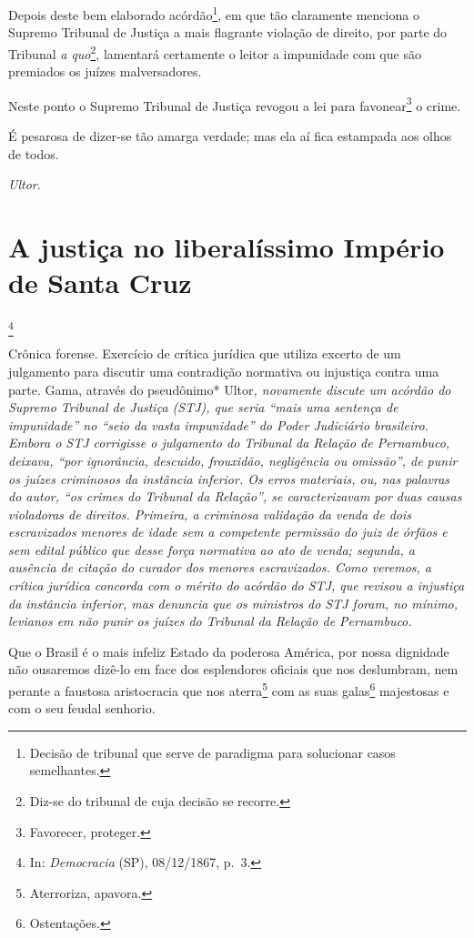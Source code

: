 Depois deste bem elaborado acórdão\footnote{Decisão de tribunal que
  serve de paradigma para solucionar casos semelhantes.}, em que tão
claramente menciona o Supremo Tribunal de Justiça a mais flagrante
violação de direito, por parte do Tribunal \emph{a quo}\footnote{
  Diz-se do tribunal de cuja decisão se recorre.}, lamentará certamente
o leitor a impunidade com que são premiados os juízes malversadores.

Neste ponto o Supremo Tribunal de Justiça revogou a lei para
favonear\footnote{Favorecer, proteger.} o crime.

É pesarosa de dizer-se tão amarga verdade; mas ela aí fica estampada aos
olhos de todos.

\emph{Ultor}.

\chapter{A justiça no liberalíssimo Império de Santa Cruz}\footnote{In:
  \emph{Democracia} (SP), 08/12/1867, p.~3.}

\begin{didascalia}
Crônica forense. Exercício de crítica jurídica que utiliza excerto de um
julgamento para discutir uma contradição normativa ou injustiça contra
uma parte. Gama, através do pseudônimo* Ultor\emph{, novamente discute
um acórdão do Supremo Tribunal de Justiça (STJ), que seria ``mais uma
sentença de impunidade'' no ``seio da vasta impunidade'' do Poder
Judiciário brasileiro. Embora o STJ corrigisse o julgamento do Tribunal
da Relação de Pernambuco, deixava, ``por ignorância, descuido, frouxidão,
negligência ou omissão'', de punir os juízes criminosos da instância
inferior. Os erros materiais, ou, nas palavras do autor, ``os crimes do
Tribunal da Relação'', se caracterizavam por duas causas violadoras de
direitos. Primeira, a criminosa validação da venda de dois escravizados
menores de idade sem a competente permissão do juiz de órfãos e sem
edital público que desse força normativa ao ato de venda; segunda, a
ausência de citação do curador dos menores escravizados. Como veremos, a
crítica jurídica concorda com o mérito do acórdão do STJ, que revisou a
injustiça da instância inferior, mas denuncia que os ministros do STJ
foram, no mínimo, levianos em não punir os juízes do Tribunal da Relação
de Pernambuco.}
\end{didascalia}

\asterisc{}

Que o Brasil é o mais infeliz Estado da poderosa América, por nossa
dignidade não ousaremos dizê-lo em face dos esplendores oficiais que nos
deslumbram, nem perante a faustosa aristocracia que nos
aterra\footnote{Aterroriza, apavora.} com as suas galas\footnote{
  Ostentações.} majestosas e com o seu feudal senhorio.

